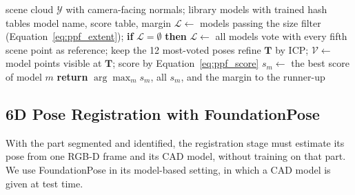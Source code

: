 \begin{algorithm}[htbp]
\caption{Part classification by point-pair features}
\label{alg:ppf}
\begin{algorithmic}[1]
\REQUIRE scene cloud $\mathcal{Y}$ with camera-facing normals; library models with trained hash tables
\ENSURE model name, score table, margin
\STATE $\mathcal{L}\gets$ models passing the size filter (Equation~\ref{eq:ppf_extent}); \textbf{if} $\mathcal{L}=\emptyset$ \textbf{then} $\mathcal{L}\gets$ all models
  \STATE vote with every fifth scene point as reference; keep the 12 most-voted poses
    \STATE refine $\mathbf{T}$ by ICP; $\mathcal{V}\gets$ model points visible at $\mathbf{T}$; score by Equation~\ref{eq:ppf_score}
  \ENDFOR
  \STATE $s_m\gets$ the best score of model $m$
\ENDFOR
\STATE \textbf{return} $\arg\max_m s_m$, all $s_m$, and the margin to the runner-up
\end{algorithmic}
\end{algorithm}

\subsection{6D Pose Registration with FoundationPose}
\label{sec:per_register}
With the part segmented and identified, the registration stage must estimate its pose from one
RGB-D frame and its CAD model, without training on that part. We use FoundationPose
\cite{wen2024foundationpose} in its model-based setting, in which a CAD model is given at test time.

